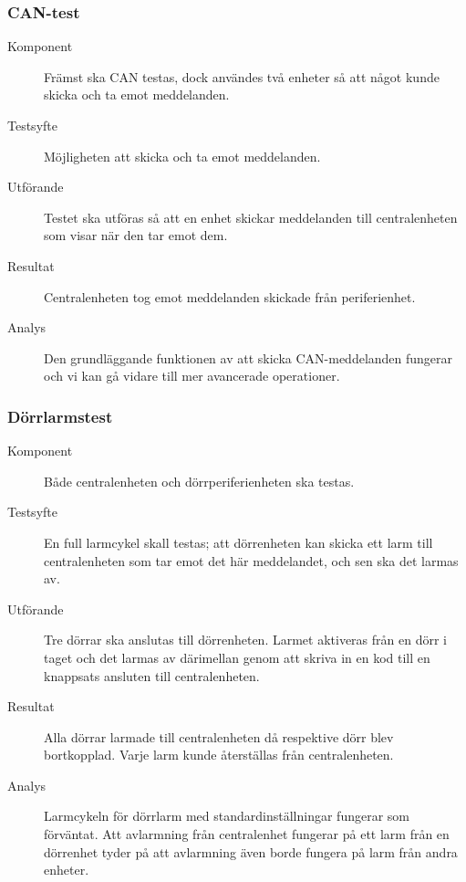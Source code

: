 \documentclass[a4paper]{article}
\begin{document}
\subsubsection{CAN-test}
\begin{description}
\item[Komponent] Främst ska CAN testas, dock användes två enheter så att något kunde skicka och ta emot meddelanden.

\item[Testsyfte] Möjligheten att skicka och ta emot meddelanden.

\item[Utförande] Testet ska utföras så att en enhet skickar meddelanden till centralenheten som visar när den tar emot dem.

\item[Resultat] Centralenheten tog emot meddelanden skickade från periferienhet.

\item[Analys] Den grundläggande funktionen av att skicka CAN-meddelanden fungerar och vi kan gå vidare till mer avancerade operationer.
\end{description}

\subsubsection{Dörrlarmstest}
\begin{description}
\item[Komponent] Både centralenheten och dörrperiferienheten ska testas.

\item[Testsyfte] En full larmcykel skall testas; att dörrenheten kan skicka ett larm till centralenheten som tar emot det här meddelandet, och sen ska det larmas av.

\item[Utförande] Tre dörrar ska anslutas till dörrenheten. Larmet aktiveras från en dörr i taget och det larmas av därimellan genom att skriva in en kod till en knappsats ansluten till centralenheten.

\item[Resultat] Alla dörrar larmade till centralenheten då respektive dörr blev bortkopplad. Varje larm kunde återställas från centralenheten.

\item[Analys] Larmcykeln för dörrlarm med standardinställningar fungerar som förväntat.
Att avlarmning från centralenhet fungerar på ett larm från en dörrenhet tyder på att avlarmning även borde fungera på larm från andra enheter.
\end{description}
\end{document}
